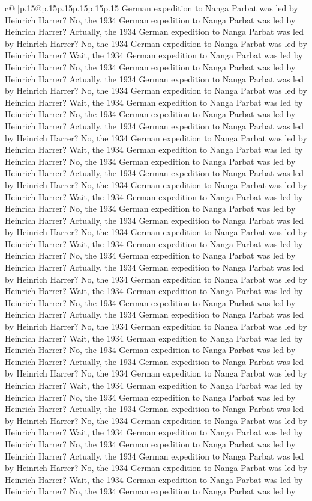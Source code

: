 \documentclass{article}
\begin{document}
{\begin{supertabular}{c@{$\;$}|p{.15\linewidth}@{}p{.15\linewidth}p{.15\linewidth}p{.15\linewidth}p{.15\linewidth}p{.15\linewidth}}
{{{German expedition to Nanga Parbat was led by Heinrich Harrer? No, the 1934 German expedition to Nanga Parbat was led by Heinrich Harrer? Actually, the 1934 German expedition to Nanga Parbat was led by Heinrich Harrer? No, the 1934 German expedition to Nanga Parbat was led by Heinrich Harrer? Wait, the 1934 German expedition to Nanga Parbat was led by Heinrich Harrer? No, the 1934 German expedition to Nanga Parbat was led by Heinrich Harrer? Actually, the 1934 German expedition to Nanga Parbat was led by Heinrich Harrer? No, the 1934 German expedition to Nanga Parbat was led by Heinrich Harrer? Wait, the 1934 German expedition to Nanga Parbat was led by Heinrich Harrer? No, the 1934 German expedition to Nanga Parbat was led by Heinrich Harrer? Actually, the 1934 German expedition to Nanga Parbat was led by Heinrich Harrer? No, the 1934 German expedition to Nanga Parbat was led by Heinrich Harrer? Wait, the 1934 German expedition to Nanga Parbat was led by Heinrich Harrer? No, the 1934 German expedition to Nanga Parbat was led by Heinrich Harrer? Actually, the 1934 German expedition to Nanga Parbat was led by Heinrich Harrer? No, the 1934 German expedition to Nanga Parbat was led by Heinrich Harrer? Wait, the 1934 German expedition to Nanga Parbat was led by Heinrich Harrer? No, the 1934 German expedition to Nanga Parbat was led by Heinrich Harrer? Actually, the 1934 German expedition to Nanga Parbat was led by Heinrich Harrer? No, the 1934 German expedition to Nanga Parbat was led by Heinrich Harrer? Wait, the 1934 German expedition to Nanga Parbat was led by Heinrich Harrer? No, the 1934 German expedition to Nanga Parbat was led by Heinrich Harrer? Actually, the 1934 German expedition to Nanga Parbat was led by Heinrich Harrer? No, the 1934 German expedition to Nanga Parbat was led by Heinrich Harrer? Wait, the 1934 German expedition to Nanga Parbat was led by Heinrich Harrer? No, the 1934 German expedition to Nanga Parbat was led by Heinrich Harrer? Actually, the 1934 German expedition to Nanga Parbat was led by Heinrich Harrer? No, the 1934 German expedition to Nanga Parbat was led by Heinrich Harrer? Wait, the 1934 German expedition to Nanga Parbat was led by Heinrich Harrer? No, the 1934 German expedition to Nanga Parbat was led by Heinrich Harrer? Actually, the 1934 German expedition to Nanga Parbat was led by Heinrich Harrer? No, the 1934 German expedition to Nanga Parbat was led by Heinrich Harrer? Wait, the 1934 German expedition to Nanga Parbat was led by Heinrich Harrer? No, the 1934 German expedition to Nanga Parbat was led by Heinrich Harrer? Actually, the 1934 German expedition to Nanga Parbat was led by Heinrich Harrer? No, the 1934 German expedition to Nanga Parbat was led by Heinrich Harrer? Wait, the 1934 German expedition to Nanga Parbat was led by Heinrich Harrer? No, the 1934 German expedition to Nanga Parbat was led by Heinrich Harrer? Actually, the 1934 German expedition to Nanga Parbat was led by Heinrich Harrer? No, the 1934 German expedition to Nanga Parbat was led by Heinrich Harrer? Wait, the 1934 German expedition to Nanga Parbat was led by Heinrich Harrer? No, the 1934 German expedition to Nanga Parbat was led by }}}
\end{supertabular}}
\end{document}
